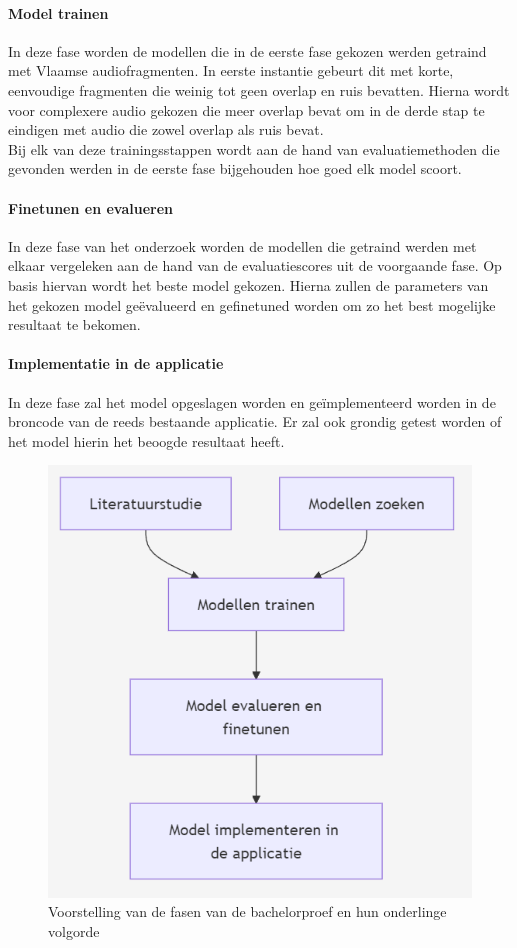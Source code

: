 \paragraph{Model trainen}
In deze fase worden de modellen die in de eerste fase gekozen werden getraind met Vlaamse audiofragmenten. In eerste instantie gebeurt dit met korte, eenvoudige fragmenten die weinig tot geen overlap en ruis bevatten. Hierna wordt voor complexere audio gekozen die meer overlap bevat om in de derde stap te eindigen met audio die zowel overlap als ruis bevat.\\
Bij elk van deze trainingsstappen wordt aan de hand van evaluatiemethoden die gevonden werden in de eerste fase bijgehouden hoe goed elk model scoort.

\paragraph{Finetunen en evalueren}
In deze fase van het onderzoek worden de modellen die getraind werden met elkaar vergeleken aan de hand van de evaluatiescores uit de voorgaande fase. Op basis hiervan wordt het beste model gekozen. Hierna zullen de parameters van het gekozen model geëvalueerd en gefinetuned worden om zo het best mogelijke resultaat te bekomen.

\paragraph{Implementatie in de applicatie}
In deze fase zal het model opgeslagen worden en geïmplementeerd worden in de broncode van de reeds bestaande applicatie. Er zal ook grondig getest worden of het model hierin het beoogde resultaat heeft.

\begin{figure}
	\centering
	\includegraphics[scale=0.75]{./img/verloop.png}
	\caption{Voorstelling van de fasen van de bachelorproef en hun onderlinge volgorde}
\end{figure}
